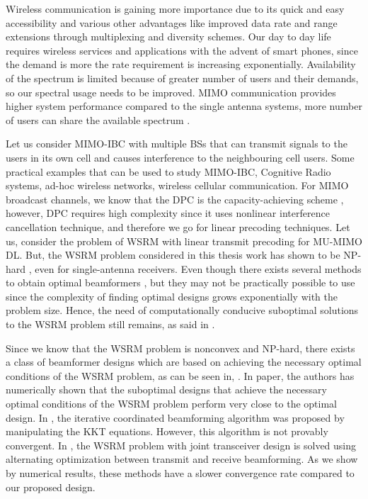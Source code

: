 \par
\thispagestyle{empty}
\acresetall
Wireless communication is gaining more importance due to its quick and easy accessibility and various other advantages like improved data rate and range extensions through multiplexing and diversity schemes. Our day to day life requires wireless services and applications with the advent of smart phones, since the demand is more the rate requirement is increasing exponentially. Availability of the spectrum is limited because of greater number of users and their demands, so our spectral usage needs to be improved. \ac{MIMO} communication provides higher system performance compared to the single antenna systems, more number of users can share the available spectrum \cite{alamouti1998simple}.

Let us consider \ac{MIMO}-\ac{IBC} with multiple \ac{BS}s that can transmit signals to the users in its own cell and causes interference to the neighbouring cell users. Some practical examples that can be used to study \ac{MIMO}-\ac{IBC}, Cognitive Radio systems, ad-hoc wireless networks, wireless cellular communication. For \ac{MIMO} broadcast channels, we know that the \ac{DPC} is the  capacity-achieving scheme \cite{weingarten2004capacity}, however, \ac{DPC} requires high complexity since it uses nonlinear interference cancellation technique, and therefore we go for linear precoding techniques. Let us, consider  the  problem  of  \ac{WSRM}  with  linear  transmit  precoding for \ac{MU}-\ac{MIMO} \ac{DL}. But,  the  \ac{WSRM}  problem considered in this thesis work has shown to be NP-hard \cite{luo2008dynamic},  even for single-antenna receivers. Even though there exists several methods to obtain optimal  beamformers \cite{joshi2012weighted,bjornson2012robust,liu2012achieving},  but they  may not  be  practically  possible to use  since  the  complexity  of  finding  optimal  designs  grows  exponentially with  the problem size. Hence, the need of computationally conducive suboptimal solutions to the WSRM problem still remains, as said in \cite{tran2012fast}.

Since we know that the \ac{WSRM} problem is nonconvex and NP-hard, there exists a class of beamformer designs which are based on achieving the necessary optimal conditions of the \ac{WSRM} problem, as can be seen in, \cite{venturino2010coordinated,ng2010linear,christensen2008weighted,shi2011iterativelyshi2011iteratively}. In  \cite{joshi2012weighted} paper, the authors has numerically shown that the suboptimal designs that achieve the necessary optimal conditions of the \ac{WSRM} problem perform very close to the optimal  design. In  \cite{venturino2010coordinated},  the  iterative  coordinated beamforming  algorithm  was  proposed by  manipulating the \ac{KKT} equations. However, this algorithm is not provably convergent. In \cite{christensen2008weighted,shi2011iterativelyshi2011iteratively},  the  \ac{WSRM}  problem with  joint  transceiver design is  solved using  alternating  optimization  between transmit  and  receive  beamforming.  As  we  show  by  numerical  results,  these  methods  have  a  slower convergence rate compared to our proposed design.

